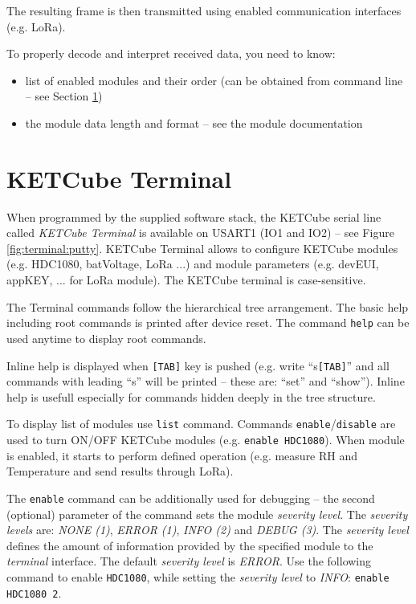 The resulting frame is then transmitted using enabled communication interfaces (e.g. LoRa). 

To properly decode and interpret received data, you need to know:
\begin{itemize}
  \item list of enabled modules and their order (can be obtained from command line -- see Section \ref{sec:terminal})
  \item the module data length and format -- see the module documentation
\end{itemize}


\clearpage
\section{KETCube Terminal}\label{sec:terminal}
When programmed by the supplied software stack, the KETCube serial line called {\it KETCube Terminal} is available on USART1 (IO1 and IO2) -- see Figure \ref{fig:terminal:putty}. KETCube Terminal allows to configure KETCube modules (e.g. HDC1080, batVoltage, LoRa ...) and module parameters (e.g. devEUI, appKEY, ... for LoRa module). The KETCube terminal is case-sensitive.

The Terminal commands follow the hierarchical tree arrangement. The basic help including root commands is printed after device reset. The command {\tt help} can be used anytime to display root commands.

Inline help is displayed when {\tt [TAB]} key is pushed (e.g. write “s{\tt [TAB]}” and all commands with leading “s” will be printed -- these are: “set” and “show”). Inline help is usefull especially for commands hidden deeply in the tree structure.

To display list of modules use {\tt list} command. Commands {\tt enable}/{\tt disable} are used to turn ON/OFF KETCube modules (e.g. {\tt enable HDC1080}). When module is enabled, it starts to perform defined operation (e.g. measure RH and Temperature and send results through LoRa). 

The {\tt enable} command can be additionally used for debugging -- the second (optional) parameter of the command sets the module {\it severity level}. The {\it severity levels} are: {\it NONE (1)}, {\it ERROR (1)}, {\it INFO (2)} and {\it DEBUG (3)}. The {\it severity level} defines the amount of information provided by the specified module to the {\it terminal} interface. The default  {\it severity level} is {\it ERROR}. Use the following command to enable {\tt HDC1080}, while setting the {\it severity level} to {\it INFO}: {\tt enable HDC1080 2}.

